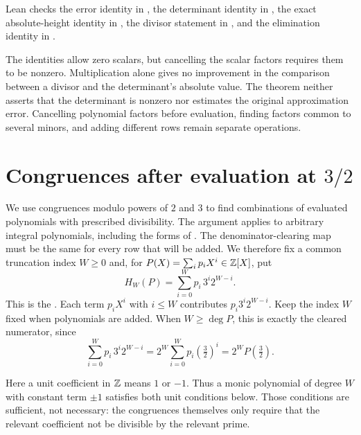 \documentclass[11pt]{article}
\begin{document}
\noindent Lean checks the error identity in
, the determinant identity in
, the exact absolute-height identity in
, the divisor statement in
, and the elimination identity in
.

The identities allow zero scalars, but cancelling the scalar factors
requires them to be nonzero. Multiplication alone gives no improvement
in the comparison between a divisor and the determinant's absolute
value. The theorem neither asserts that the determinant is nonzero nor
estimates the original approximation error. Cancelling polynomial
factors before evaluation, finding factors common to several minors,
and adding different rows remain separate operations.

\section{Congruences after evaluation at \texorpdfstring{$3/2$}{3/2}}\label{long1049:sec:endpoints}

We use congruences modulo powers of $2$ and $3$ to find combinations
of evaluated polynomials with prescribed divisibility. The argument
applies to arbitrary integral polynomials, including the forms of
\cite[Sections~3--5]{zudilin2004}. The denominator-clearing map must be the same for every row that
will be added. We therefore fix a common truncation index $W\ge0$
and, for $P(X)=\sum_i p_iX^i\in\mathbb{Z}[X]$, put
\[
 H_W(P)=\sum_{i=0}^{W}p_i\,3^i2^{W-i}.
\]
This is the
.  Each term \(p_iX^i\) with \(i\le W\) contributes
\(p_i3^i2^{W-i}\). Keep the index \(W\) fixed when polynomials are
added. When \(W\ge\deg P\), this is exactly the cleared numerator, since
\[
 \sum_{i=0}^{W}p_i\,3^i2^{W-i}=2^{W}\sum_{i=0}^{W}p_i\left(\tfrac32\right)^{i}
 =2^{W}P\!\left(\tfrac32\right).
\]

Here a unit coefficient in $\mathbb{Z}$ means $1$ or $-1$. Thus a monic
polynomial of degree $W$ with constant term $\pm1$ satisfies both unit
conditions below. Those conditions are sufficient, not necessary:
the congruences themselves only require that the relevant coefficient
not be divisible by the relevant prime.
\end{document}
